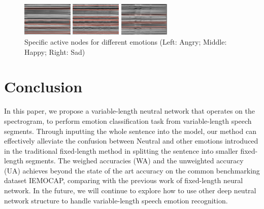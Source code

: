 \documentclass[a4paper]{article}
\begin{document}
\begin{figure}[htb]
    \begin{minipage}[b]{0.3\linewidth}
      \centering
      \centerline{\includegraphics[width=2.4cm]{rnn_out_var_ang}}
    \end{minipage}
    \hfill
    \begin{minipage}[b]{0.3\linewidth}
      \centering
      \centerline{\includegraphics[width=2.4cm]{rnn_out_var_hap}}
    \end{minipage}
    \hfill
    \begin{minipage}[b]{0.3\linewidth}
      \centering
      \centerline{\includegraphics[width=2.4cm]{rnn_out_var_sad}}
    \end{minipage}
    \caption{Specific active nodes for different emotions (Left: Angry; Middle: Happy; Right: Sad)}
    \label{fig:rnn_emo}
\end{figure}

    
\section{Conclusion}
\label{sec:conclusion}

In this paper, we propose a variable-length neutral network that operates on the spectrogram, to perform emotion classification task from variable-length speech segments. Through inputting the whole sentence into the model, our method can effectively alleviate the confusion between Neutral and other emotions introduced in the traditional fixed-length method in splitting the sentence into smaller fixed-length segments. The weighed accuracies (WA) and the unweighted accuracy (UA) achieves beyond the state of the art accuracy on the common benchmarking dataset IEMOCAP, comparing with the previous work of fixed-length neural network. In the future, we will continue to explore how to use other deep neutral network structure to handle variable-length speech emotion recognition.
\end{document}
